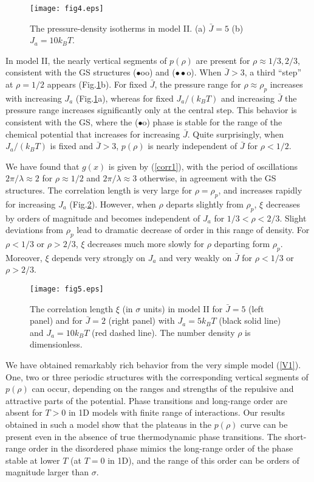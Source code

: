 \documentclass[preprint,
prl,%
aps]{revtex4}
\begin{document}
\begin{figure}[h]
\centering
\texttt{[image: fig4.eps]}
\caption{The pressure-density isotherms in model II. (a) $\bar J=5$ (b) $J_a=10k_BT$.
 }
\label{fig.pzeta_2}
\end{figure}
%
In model II,  the nearly vertical segments of $p(\rho)$ are present 
for $\rho\approx1/3,2/3$, consistent with the GS structures 
($\bullet$oo) and ($\bullet \bullet$o).
When  $\bar J> 3$, a 
third ``step'' at $\rho=1/2$ appears (Fig.\ref{fig.pzeta_2}b). For 
  fixed $\bar J$, the  pressure range for $\rho\approx\rho_p$ increases
  with increasing $J_a$ (Fig.\ref{fig.pzeta_2}a), whereas for fixed $ J_a/(k_BT)$ and increasing $\bar J$ 
the  pressure range increases significantly  
only at the central step. This behavior is consistent with the GS, where  the  ($\bullet$o) phase
is stable for the range of
the chemical potential that increases for increasing $\bar J$.
Quite surprisingly,  when
 $J_a/(k_BT)$  is fixed and $\bar J>3$, 
  $p(\rho)$   is nearly independent of $\bar J$ for $\rho<1/2$. 

We have found that  $g(x)$ is given by (\ref{corr1}), with the period of oscillations $2\pi/\lambda\approx 2$ for 
$\rho\approx 1/2$ and $2\pi/\lambda\approx 3$ otherwise, in agreement with the GS structures. 
The correlation length is very large for $\rho=\rho_p$, and increases rapidly 
for increasing $J_a$ (Fig.\ref{fig.cor1}). However, 
 when $\rho$ departs slightly from $\rho_p$, $\xi$ decreases by orders of magnitude
 and becomes independent of $J_a$ for $1/3< \rho< 2/3$. 
 Slight deviations from $\rho_p$ lead to dramatic decrease of order in this range of density.
 For $\rho<1/3$ or $\rho>2/3$,
$\xi$ decreases much more slowly for $\rho$ departing form $\rho_p$. Moreover, $\xi$ 
depends very strongly on $J_a$ and very weakly on $\bar J$ for $\rho<1/3$ or $\rho>2/3$.

%
 \begin{figure}[h]
\centering
\texttt{[image: fig5.eps]}
\caption{The correlation length $\xi$ (in  $\sigma$ units)
in model II for $\bar J=5$  (left panel) and for $\bar J = 2$ (right panel)
with $J_a=5k_BT$ (black solid line) and $J_a=10k_BT$ (red dashed line).
The number density $\rho$ is dimensionless.
}
\label{fig.cor1}
\end{figure}

We have obtained remarkably rich behavior from the very simple model (\ref{V1}). One, two or three periodic
structures with the corresponding vertical segments of $p(\rho)$ can occur, depending on the ranges and strengths
of the repulsive and attractive parts of the potential. 
Phase transitions
and   long-range order are absent for $T>0$ in  1D models with finite range of interactions. 
Our results obtained in such a model show that
the plateaus in the 
$p(\rho)$ curve can be present even in the absence 
of true thermodynamic phase transitions. The short-range order in the disordered phase mimics 
the long-range order of the phase
stable at lower $T$ (at $T=0$ in 1D), and the range of this order can be orders of magnitude larger than $\sigma$. 
\end{document}
